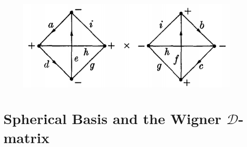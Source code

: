 \documentclass[11pt]{article}
\begin{document}
\begin{appendices}
\begin{figure}[!htb]
	\caption{}
	\label{fig:transf2}
\end{figure}
\begin{figure}[!htb]
	\centering
	\includegraphics[scale=0.7]{transformation_2}
	\caption{}
	\label{fig:transf1}
\end{figure}










\section{Spherical Basis and the Wigner $\mathcal{D}$-matrix}\label{app:Spherical}


\end{appendices}
\end{document}
